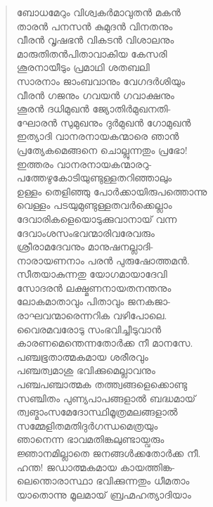 \begin{verse}
ബോധമേറും വിശ്വകര്‍മാവുതന്‍ മകന്‍\\
താരന്‍ പനസന്‍ കുമുദന്‍ വിനതനും\\
വീരന്‍ വൃഷഭന്‍ വികടന്‍ വിശാലനും\\
മാരുതിതന്‍പിതാവാകിയ കേസരി\\
ശൂരനായീടും പ്രമാഥി ശതബലി\\
സാരനാം ജാംബവാനും വേഗദര്‍ശിയും\\
വീരന്‍ ഗജനും ഗവയന്‍ ഗവാക്ഷനും\\
ശൂരന്‍ ദധിമുഖന്‍ ജ്യോതിര്‍മുഖനതി-\\
ഘോരന്‍ സുമുഖനും ദുര്‍മുഖന്‍ ഗോമുഖന്‍\\
ഇത്യാദി വാനരനായകന്മാരെ ഞാന്‍\\
പ്രത്യേകമെങ്ങനെ ചൊല്ലുന്നതും പ്രഭോ!\\
ഇത്തരം വാനരനായകന്മാരറു-\\
പത്തേഴുകോടിയുണ്ടുള്ളതറിഞ്ഞാലും\\
ഉള്ളം തെളിഞ്ഞു പോര്‍ക്കായിരുപത്തൊന്നു\\
വെള്ളം പടയുമുണ്ടുള്ളതവര്‍ക്കെല്ലാം\\
ദേവാരികളെയൊടുക്കുവാനായ് വന്ന\\
ദേവാംശസംഭവന്മാരിവരേവരും\\
ശ്രീരാമദേവനും മാനുഷനല്ലാദി-\\
നാരായണനാം പരന്‍ പുരുഷോത്തമന്‍.\\
സീതയാകുന്നതു യോഗമായാദേവി\\
സോദരന്‍ ലക്ഷ്മണനായതനന്തനും\\
ലോകമാതാവും പിതാവും ജനകജാ-\\
രാഘവന്മാരെന്നറിക വഴിപോലെ.\\
വൈരമവരോടു സംഭവിച്ചീടുവാന്‍\\
കാരണമെന്തെന്നതോര്‍ക്ക നീ മാനസേ.\\
പഞ്ചഭൂതാത്മകമായ ശരീരവും\\
പഞ്ചത്വമാശു ഭവിക്കുമെല്ലാവനും\\
പഞ്ചപഞ്ചാത്മക തത്ത്വങ്ങളെക്കൊണ്ടു\\
സഞ്ചിതം പുണ്യപാപങ്ങളാല്‍ ബദ്ധമായ്\\
ത്വങ്മാംസമേദോസ്ഥിമൂത്രമലങ്ങളാല്‍\\
സമ്മേളിതമതിദുര്‍ഗന്ധമെത്രയും\\
ഞാനെന്ന ഭാവമതിങ്കലുണ്ടായ്വരും\\
ജ്ഞാനമില്ലാതെ ജനങ്ങള്‍ക്കതോര്‍ക്ക നീ.\\
ഹന്ത! ജഡാത്മകമായ കായത്തിങ്ക-\\
ലെന്തൊരാസ്ഥാ ഭവിക്കുന്നതും ധീമതാം\\
യാതൊന്നു മൂലമായ് ബ്രഹ്മഹത്യാദിയാം\\

\end{verse}
